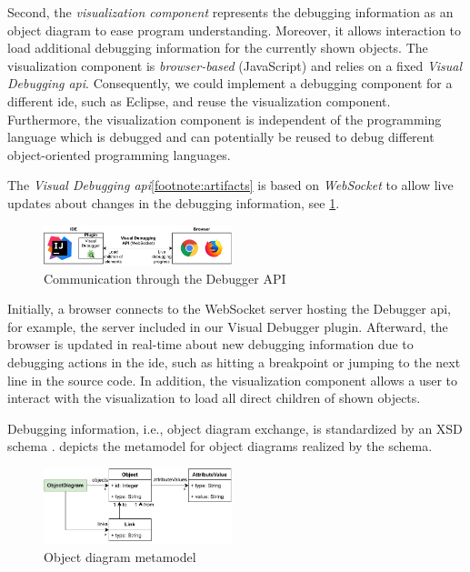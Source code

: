 \documentclass[conference]{IEEEtran}
\begin{document}
Second, the \textit{visualization component} represents the debugging information as an object diagram to ease program understanding.
Moreover, it allows interaction to load additional debugging information for the currently shown objects.
The visualization component is \emph{browser-based} (JavaScript) and relies on a fixed \emph{Visual Debugging \gls*{api}}.
Consequently, we could implement a debugging component for a different \gls*{ide}, such as Eclipse, and reuse the visualization component.
Furthermore, the visualization component is independent of the programming language which is debugged and can potentially be reused to debug different object-oriented programming languages.

The \textit{Visual Debugging \gls*{api}}\cref{footnote:artifacts} is based on \emph{WebSocket} to allow live updates about changes in the debugging information, see \cref{fig:api}.

\begin{figure}[h]
    \centering
    \includegraphics[width=0.488\textwidth]{images/VD-architecture.pdf}
    \caption{Communication through the Debugger API}
    \label{fig:api}
\end{figure}

Initially, a browser connects to the WebSocket server hosting the Debugger \gls*{api}, for example, the server included in our Visual Debugger plugin.
Afterward, the browser is updated in real-time about new debugging information due to debugging actions in the \gls*{ide}, such as hitting a breakpoint or jumping to the next line in the source code.
In addition, the visualization component allows a user to interact with the visualization to load all direct children of shown objects.

Debugging information, i.e., object diagram exchange, is standardized by an XSD schema \cite{ArtifactsICSME2022}.
 depicts the metamodel for object diagrams realized by the schema.

\begin{figure}[h]
    \centering
    \includegraphics[width=0.488\textwidth]{images/VD-metamodel.pdf}
    \caption{Object diagram metamodel}
    \label{fig:odMetamodel}
\end{figure}
\end{document}
